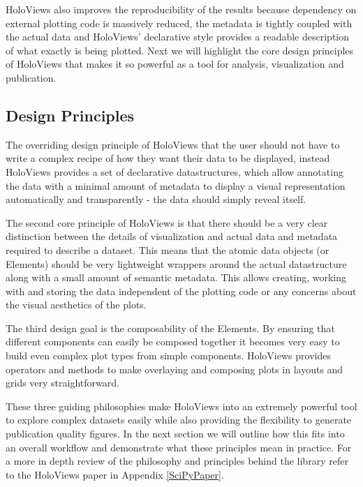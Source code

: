 HoloViews also improves the reproducibility of the results because
dependency on external plotting code is massively reduced, the
metadata is tightly coupled with the actual data and HoloViews'
declarative style provides a readable description of what exactly is
being plotted. Next we will highlight the core design principles of
HoloViews that makes it so powerful as a tool for analysis,
visualization and publication.

\subsection{Design Principles}

The overriding design principle of HoloViews that the user should not
have to write a complex recipe of how they want their data to be
displayed, instead HoloViews provides a set of declarative
datastructures, which allow annotating the data with a minimal amount
of metadata to display a visual representation automatically and
transparently - the data should simply reveal itself.

The second core principle of HoloViews is that there should be a very
clear distinction between the details of visualization and actual data
and metadata required to describe a dataset. This means that the
atomic data objects (or Elements) should be very lightweight wrappers
around the actual datastructure along with a small amount of semantic
metadata. This allows creating, working with and storing the data
independent of the plotting code or any concerns about the visual
aesthetics of the plots.

The third design goal is the composability of the Elements. By
ensuring that different components can easily be composed together it
becomes very easy to build even complex plot types from simple
components. HoloViews provides operators and methods to make
overlaying and composing plots in layouts and grids very
straightforward.

These three guiding philosophies make HoloViews into an extremely
powerful tool to explore complex datasets easily while also providing
the flexibility to generate publication quality figures. In the next
section we will outline how this fits into an overall workflow and
demonstrate what these principles mean in practice. For a more in
depth review of the philosophy and principles behind the library refer
to the HoloViews paper in Appendix \ref{SciPyPaper}.


